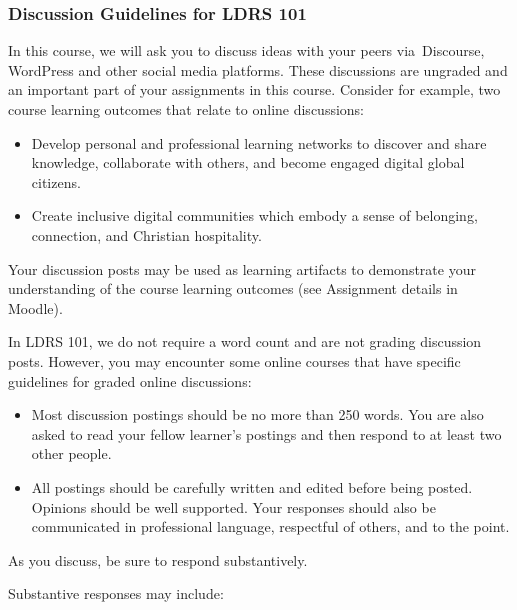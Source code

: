 \documentclass[
]{book}
\providecommand{\tightlist}{%
  \setlength{\itemsep}{0pt}\setlength{\parskip}{0pt}}
\theoremstyle{definition}
\theoremstyle{definition}
\theoremstyle{definition}
\theoremstyle{definition}
\theoremstyle{remark}
\begin{document}
\hypertarget{discussion-guidelines-for-ldrs-101}{%
\subsubsection*{Discussion Guidelines for LDRS 101}\label{discussion-guidelines-for-ldrs-101}}

In this course, we will ask you to discuss ideas with your peers via~Discourse, WordPress and other social media platforms. These discussions are ungraded and an important part of your assignments in this course. Consider for example, two course learning outcomes that relate to online discussions:

\begin{itemize}
\tightlist
\item
  Develop personal and professional learning networks to discover and share knowledge, collaborate with others, and become engaged digital global citizens.\\
\item
  Create inclusive digital communities which embody a sense of belonging, connection, and Christian hospitality.
\end{itemize}

Your discussion posts may be used as learning artifacts to demonstrate your understanding of the course learning outcomes (see Assignment details in Moodle).

In LDRS 101, we do not require a word count and are not grading discussion posts. However, you may encounter some online courses that have specific guidelines for graded online discussions:

\begin{itemize}
\tightlist
\item
  Most discussion postings should be no more than 250 words. You are also asked to read your fellow learner's postings and then respond to at least two other people.\\
\item
  All postings should be carefully written and edited before being posted. Opinions should be well supported. Your responses should also be communicated in professional language, respectful of others, and to the point.
\end{itemize}

As you discuss, be sure to respond substantively.

Substantive responses may include:
\end{document}
